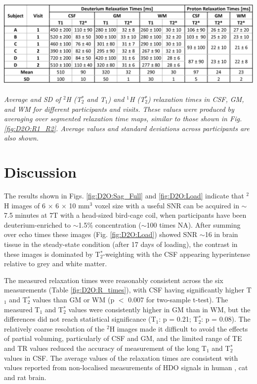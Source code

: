 \begin{table}[H]
    \centering
    \includegraphics[width=1\textwidth]{Figures/D2O/R_Times.png}
    \caption{\textit{Average and SD of $^2$H (T$_2^*$ and T$_1$) and $^1$H (T$_2^*$) relaxation times in \ac{CSF}, \ac{GM}, and \ac{WM} for different participants and visits. These values were produced by averaging over segmented relaxation time maps, similar to those shown in Fig. \ref{fig:D2O:R1_R2}. Average values and standard deviations across participants are also shown.}}
    \label{fig:D2O:R_times}
\end{table}
 
\section{Discussion}

The results shown in Figs. \ref{fig:D2O:Sag_Full} and \ref{fig:D2O:Load} indicate that $^2$H images of 6 $\times$ 6 $\times$ 10 mm$^3$ voxel size with a useful \ac{SNR} can be acquired in $\sim$7.5 minutes at 7T with a head-sized bird-cage coil, when participants have been deuterium-enriched to $\sim$1.5\% concentration ($\sim$100 times \ac{NA}). After summing over echo times these images (Fig. \ref{fig:D2O:Load}) showed \ac{SNR} $\sim$16 in brain tissue in the steady-state condition (after 17 days of loading), the contrast in these images is dominated by T$_2^*$-weighting with the \ac{CSF} appearing hyperintense relative to grey and white matter.

The measured relaxation times were reasonably consistent across the six measurements (Table \ref{fig:D2O:R_times}), with \ac{CSF} having significantly higher T$_1$ and T$_2^*$ values than \ac{GM} or \ac{WM} (p $<$ 0.007 for two-sample t-test). The measured T$_1$ and T$_2^*$ values were consistently higher in \ac{GM} than in \ac{WM}, but the differences did not reach statistical significance (T$_1$: p = 0.21; T$_2^*$: p = 0.08). The relatively coarse resolution of the $^2$H images made it difficult to avoid the effects of partial voluming, particularly of \ac{CSF} and \ac{GM}, and the limited range of \ac{TE} and \ac{TR} values reduced the accuracy of measurement of the long T$_1$ and T$_2^*$ values in \ac{CSF}. The average values of the relaxation times are consistent with values reported from non-localised measurements of \ac{HDO} signals in human \cite{DeFeyter2018DeuteriumVivo,DeFeyter2021DeuteriumFuture,Ruhm2021DeuteriumResolution}, cat \cite{Ewy1988DeuteriumSitu} and rat  \cite{DeFeyter2018DeuteriumVivo,Lu2017QuantitativeSpectroscopy} brain.

